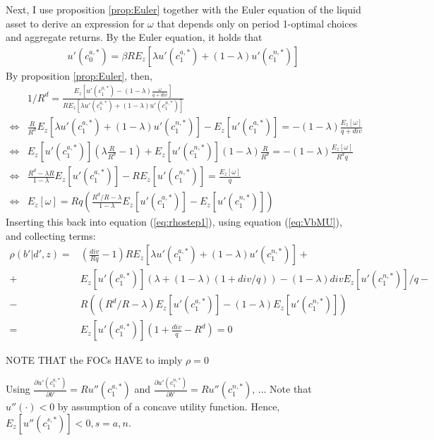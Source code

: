 \documentclass[11pt]{article} %
\begin{document}
Next, I use proposition \ref{prop:Euler} together with the Euler equation of the liquid asset to derive an expression for $\omega$ that depends only on period 1-optimal choices and aggregate returns. By the Euler equation, it holds that
\begin{align}
u'(c^{a,*}_0) = \beta R E_z [\lambda u'(c^{a,*}_1)+(1-\lambda) u'(c^{n,*}_1)]
\end{align}
By proposition \ref{prop:Euler}, then,
\begin{align}
&1/R^d = \frac{E_z\left[ u'(c^{a,*}_1)-(1-\lambda)\frac{\omega}{q+div}\right] }{RE_z[\lambda u'(c^{a,*}_1)+(1-\lambda)u'(c^{n,*}_1)]}\\
\Leftrightarrow& \frac{R}{R^d}E_z[\lambda u'(c^{a,*}_1)+(1-\lambda) u'(c^{n,*}_1)] - E_z[u'(c_1^{a,*})] = -(1-\lambda)\frac{E_z[\omega]}{q+div}\\
\Leftrightarrow & E_z[u'(c^{a,*}_1)] \left( \lambda \frac{R}{R^d} - 1\right) + E_z[u'(c^{n,*}_1)] (1-\lambda) \frac{R}{R^d} = -(1-\lambda) \frac{E_z[\omega]}{R^d q}\\
\Leftrightarrow &\frac{R^d - \lambda R}{1-\lambda} E_z[u'(c^{a,*}_1)] - R E_z[u'(c^{n,*}_1)]  = \frac{E_z[\omega]}{q}\\
\Leftrightarrow & E_z[\omega] = Rq \left( \frac{R^d/R-\lambda}{1-\lambda} E_z[u'(c^{a,*}_1)]-E_z[u'(c^{n,*}_1)] \right)
\end{align}
Inserting this back into equation (\ref{eq:rhostep1}), using equation (\ref{eq:VbMU}), and collecting terms:
\begin{align}
\rho(b'|d',z)=&\left(\frac{div}{Rq}-1\right) R E_z[\lambda u'(c^{a,*}_1)+(1-\lambda)u'(c^{n,*}_1)] +\nonumber \\
+&  E_z[u'(c^{a,*}_1)](\lambda + (1-\lambda)(1+div/q)) - (1-\lambda)div E_z[u'(c^{n,*}_1)]/q -\nonumber \\- &  R ( (R^d/R-\lambda) E_z[u'(c^{a,*}_1)] - (1-\lambda) E_z[u'(c^{n,*}_1)])\\
= & E_z[u'(c^{a,*}_1)]\left(1+\frac{div}{q}-R^d\right) = 0
\end{align}

NOTE THAT the FOCs HAVE to imply $\rho=0$

Using $\frac{\partial u'(c^{a,*}_1)}{\partial b'} = R u''(c^{a,*}_1)$ and $\frac{\partial u'(c^{n,*}_1)}{\partial b'} = R u''(c^{n,*}_1)$, ...
Note that $u''(\cdot)<0$ by assumption of a concave utility function. Hence, $E_z[u''(c^{s,*}_1)]<0, s=a,n$.
\end{document}
